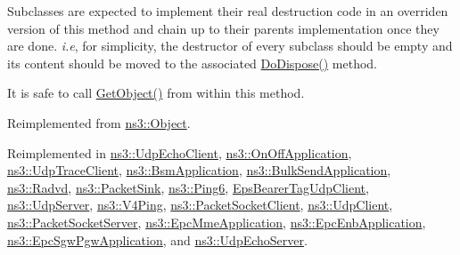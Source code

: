 Subclasses are expected to implement their real destruction code in an overriden version of this method and chain up to their parent\textquotesingle{}s implementation once they are done. {\itshape i.\+e}, for simplicity, the destructor of every subclass should be empty and its content should be moved to the associated \hyperlink{classns3_1_1Application_a89f6c9454532d62600251872bede6d04}{Do\+Dispose()} method.

It is safe to call \hyperlink{classns3_1_1Object_a13e18c00017096c8381eb651d5bd0783}{Get\+Object()} from within this method. 

Reimplemented from \hyperlink{classns3_1_1Object_a475d429a75d302d4775f4ae32479b287}{ns3\+::\+Object}.



Reimplemented in \hyperlink{classns3_1_1UdpEchoClient_ab2c8649b6fe1db561db51ac2a2910cc6}{ns3\+::\+Udp\+Echo\+Client}, \hyperlink{classns3_1_1OnOffApplication_a2f40033ee778880bc21fd73339f38147}{ns3\+::\+On\+Off\+Application}, \hyperlink{structns3_1_1UdpTraceClient_aaf10979a3843bb8dd964c31baaa6e000}{ns3\+::\+Udp\+Trace\+Client}, \hyperlink{classns3_1_1BsmApplication_ac3e2c412d85bd266a9da9bf56c6e418a}{ns3\+::\+Bsm\+Application}, \hyperlink{classns3_1_1BulkSendApplication_a9a9a02d7f92d686e9db82f0ef950a9ff}{ns3\+::\+Bulk\+Send\+Application}, \hyperlink{classns3_1_1Radvd_aeeb3bca9545ac42f2795fa9c047319f4}{ns3\+::\+Radvd}, \hyperlink{classns3_1_1PacketSink_a00aee3d4e6a589e9e17a2c75f7e0c710}{ns3\+::\+Packet\+Sink}, \hyperlink{classns3_1_1Ping6_a455f7e0d45e50d6bfaa2fdf8812f5af4}{ns3\+::\+Ping6}, \hyperlink{classEpsBearerTagUdpClient_acb9d12aa9b3f0baa4e16eabd92619e6a}{Eps\+Bearer\+Tag\+Udp\+Client}, \hyperlink{classns3_1_1UdpServer_ad71ef84dbd09cd3356c007cbfecf660e}{ns3\+::\+Udp\+Server}, \hyperlink{classns3_1_1V4Ping_a78c38c5ceb8df123483c27421e2257ad}{ns3\+::\+V4\+Ping}, \hyperlink{classns3_1_1PacketSocketClient_a2a3799f42514d3ca607143add4cab8c2}{ns3\+::\+Packet\+Socket\+Client}, \hyperlink{classns3_1_1UdpClient_a414e67a17b0d38c0567a6ffe9a3cb1a3}{ns3\+::\+Udp\+Client}, \hyperlink{classns3_1_1PacketSocketServer_a2958bd54bb9a6c8d1ece84b0c54228bb}{ns3\+::\+Packet\+Socket\+Server}, \hyperlink{classns3_1_1EpcMmeApplication_ad11b5b5da8db97f6544be1677585def7}{ns3\+::\+Epc\+Mme\+Application}, \hyperlink{classns3_1_1EpcEnbApplication_a4cf14ef748630fa2ad5f46f566e6a875}{ns3\+::\+Epc\+Enb\+Application}, \hyperlink{classns3_1_1EpcSgwPgwApplication_a8cec25fb185f15c9862a1f1e31c66525}{ns3\+::\+Epc\+Sgw\+Pgw\+Application}, and \hyperlink{classns3_1_1UdpEchoServer_a4991a903cb822d78729c73e044705bc9}{ns3\+::\+Udp\+Echo\+Server}.


